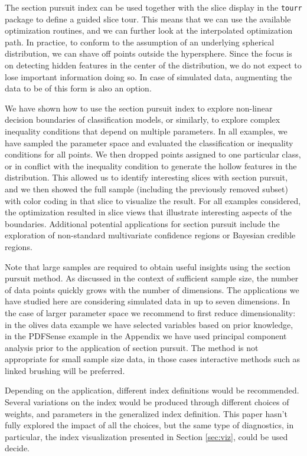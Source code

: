 \documentclass[]{interact}
\theoremstyle{plain}%
\theoremstyle{definition}
\theoremstyle{remark}
\begin{document}
The section pursuit index can be used together with the slice display in
the \texttt{tourr} package to define a guided slice tour. This means
that we can use the available optimization routines, and we can further
look at the interpolated optimization path. In practice, to conform to
the assumption of an underlying spherical distribution, we can shave off
points outside the hypersphere. Since the focus is on detecting hidden
features in the center of the distribution, we do not expect to lose
important information doing so. In case of simulated data, augmenting
the data to be of this form is also an option.

We have shown how to use the section pursuit index to explore non-linear
decision boundaries of classification models, or similarly, to explore
complex inequality conditions that depend on multiple parameters. In all
examples, we have sampled the parameter space and evaluated the
classification or inequality conditions for all points. We then dropped
points assigned to one particular class, or in conflict with the
inequality condition to generate the hollow features in the
distribution. This allowed us to identify interesting slices with
section pursuit, and we then showed the full sample (including the
previously removed subset) with color coding in that slice to visualize
the result. For all examples considered, the optimization resulted in
slice views that illustrate interesting aspects of the boundaries.
Additional potential applications for section pursuit include the
exploration of non-standard multivariate confidence regions or Bayesian
credible regions.

Note that large samples are required to obtain useful insights using the
section pursuit method. As discussed in the context of sufficient sample
size, the number of data points quickly grows with the number of
dimensions. The applications we have studied here are considering
simulated data in up to seven dimensions. In the case of larger
parameter space we recommend to first reduce dimensionality: in the
olives data example we have selected variables based on prior knowledge,
in the PDFSense example in the Appendix we have used principal component
analysis prior to the application of section pursuit. The method is not
appropriate for small sample size data, in those cases interactive
methods such as linked brushing will be preferred.

Depending on the application, different index definitions would be
recommended. Several variations on the index would be produced through
different choices of weights, and parameters in the generalized index
definition. This paper hasn't fully explored the impact of all the
choices, but the same type of diagnostics, in particular, the index
visualization presented in Section \ref{sec:viz}, could be used decide.
\end{document}
